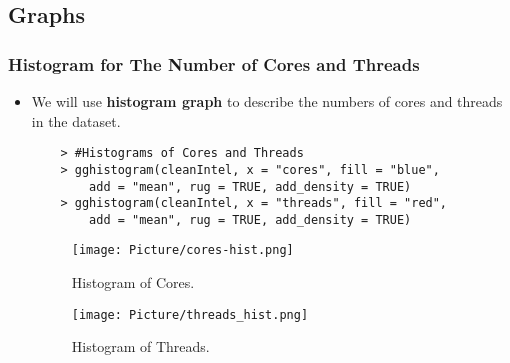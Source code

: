 \documentclass[a4paper]{article}
\begin{document}
\subsection{Graphs}
\subsubsection{Histogram for The Number of Cores and Threads}
\begin{itemize}
    \item[] We will use \textbf{histogram graph} to describe the numbers of cores and threads in the dataset.
    
    \begin{lstlisting}
    > #Histograms of Cores and Threads
    > gghistogram(cleanIntel, x = "cores", fill = "blue",
        add = "mean", rug = TRUE, add_density = TRUE)
    > gghistogram(cleanIntel, x = "threads", fill = "red",
        add = "mean", rug = TRUE, add_density = TRUE)
    \end{lstlisting}
    
    \begin{figure}[H]
        \centering
        \texttt{[image: Picture/cores-hist.png]}
        \caption{Histogram of Cores.}
    \end{figure}
    
    \begin{figure}[H]
        \centering
        \texttt{[image: Picture/threads\_hist.png]}
        \caption{Histogram of Threads.}
    \end{figure}
\end{itemize}
\end{document}

